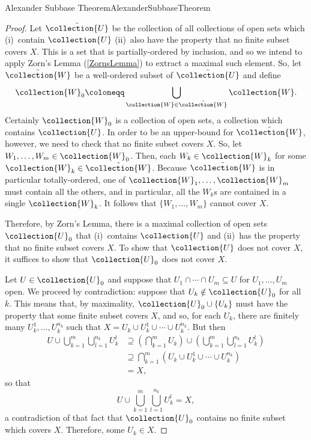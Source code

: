 \begin{thm}{Alexander Subbase Theorem}{AlexanderSubbaseTheorem}
\begin{proof}
Let $\tilde{\collection{U}}$ be the collection of all collections of open sets which (i)~contain $\collection{U}$ (ii)~also have the property that no finite subset covers $X$.  This is a set that is partially-ordered by inclusion, and so we intend to apply Zorn's Lemma (\cref{ZornsLemma}) to extract a maximal such element.  So, let $\tilde{\collection{W}}$ be a well-ordered subset of $\tilde{\collection{U}}$ and define
\begin{equation}
\collection{W}_0\coloneqq \bigcup _{\collection{W}\in \tilde{\collection{W}}}\collection{W}.
\end{equation}
Certainly $\collection{W}_0$ is a collection of open sets, a collection which contains $\collection{U}$.  In order to be an upper-bound for $\tilde{\collection{W}}$, however, we need to check that no finite subset covers $X$.  So, let $W_1,\ldots ,W_m\in \collection{W}_0$.  Then, each $W_k\in \collection{W}_k$ for some $\collection{W}_k\in \tilde{\collection{W}}$.  Because $\tilde{\collection{W}}$ is in particular totally-ordered, one of $\collection{W}_1,\ldots ,\collection{W}_m$ must contain all the others, and in particular, all the $W_k$s are contained in a single $\collection{W}_k$.  It follows that $\{ W_1,\ldots ,W_m\}$ cannot cover $X$.

Therefore, by Zorn's Lemma, there is a maximal collection of open sets $\collection{U}_0$ that (i)~contains $\collection{U}$ and (ii)~has the property that no finite subset covers $X$.  To show that $\collection{U}$ does not
cover $X$, it suffices to show that $\collection{U}_0$ does not cover $X$.

Let $U\in \collection{U}_0$ and suppose that $U_1\cap \cdots \cap U_m\subseteq U$ for $U_1,\ldots ,U_m$ open.  We proceed by contradiction:  suppose that $U_k\notin \collection{U}_0$ for all $k$.  This means that, by maximality, $\collection{U}_0\cup \{ U_k\}$ must have the property that some finite subset covers $X$, and so, for each $U_k$, there are finitely many $U_k^1,\ldots ,U_k^{n_k}$ such that $X=U_k\cup U_k^1\cup \cdots \cup U_k^{n_k}$.  But then
\begin{equation}
\begin{split}
U\cup \bigcup _{k=1}^m\bigcup _{l=1}^{n_k}U_k^l & \supseteq \left( \bigcap _{k=1}^mU_k\right) \cup \left( \bigcup _{k=1}^m\bigcup _{l=1}^{n_k}U_k^l\right) \\
& \supseteq \bigcap _{k=1}^m\left( U_k\cup U_k^1\cup \cdots \cup U_k^{n_k}\right) \\
& =X,
\end{split}
\end{equation}
so that
\begin{equation}
U\cup \bigcup _{k=1}^m\bigcup _{l=1}^{n_k}U_k^l=X,
\end{equation}
a contradiction of that fact that $\collection{U}_0$ contains no finite subset which covers $X$.  Therefore, some $U_k\in X$.


\end{proof}
\end{thm}
